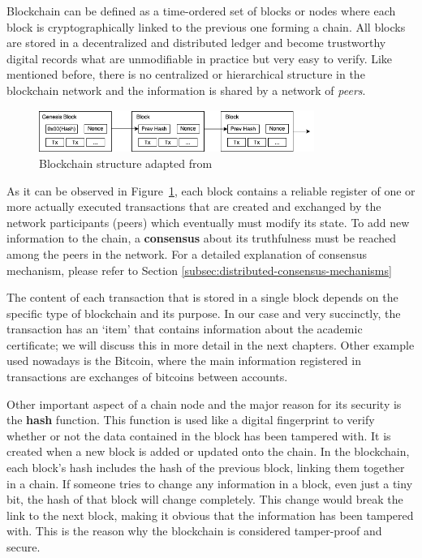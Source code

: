 Blockchain can be defined as a time-ordered set of blocks or nodes where each block is cryptographically linked to the previous one forming a chain. All blocks are stored in a decentralized and distributed ledger and become
trustworthy digital records what are unmodifiable in practice but very easy to verify. Like mentioned before, there is no centralized or hierarchical structure in the blockchain network and the information is shared by a network of \textit{peers}.

\begin{figure}[h]\label{fig:blockchain}
    \begin{center}
        \includegraphics[width=0.8\textwidth]{assets/blockchain.png}
        \caption{Blockchain structure adapted from~\cite{nakamoto2008bitcoin}}
    \end{center}
\end{figure}

As it can be observed in Figure~\ref{fig:blockchain}, each block contains a reliable register of one or more actually executed transactions that are created and exchanged by the network participants (peers) which eventually must modify
its state. To add new information to the chain, a \textbf{consensus} about its truthfulness must be reached among the peers in the network.
For a detailed explanation of consensus mechanism, please refer to Section \ref{subsec:distributed-consensus-mechanisms}

The content of each transaction that is stored in a single block depends on the specific type of blockchain and its purpose. In our case and very succinctly, the transaction has an `item' that contains information about the academic certificate; we will discuss this in more detail in the next chapters. Other example used nowadays is the Bitcoin, where the main information registered in transactions are exchanges of bitcoins between accounts.

Other important aspect of a chain node and the major reason for its security is the \textbf{hash} function.
This function is used like a digital fingerprint to verify whether or not the data contained in the block has been tampered with. It is created when a new block is added or updated onto the chain.
In the blockchain, each block's hash includes the hash of the previous block, linking them together in a chain. If someone tries to change any information in a block, even just a tiny bit, the hash of that block will change completely. This change would break the link to the next block, making it obvious that the information has been tampered with.
This is the reason why the blockchain is considered tamper-proof and secure.

